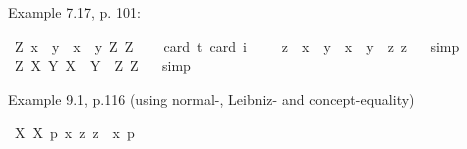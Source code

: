 \begin{isabellebody}
\begin{isamarkuptext}
Example 7.17, p. 101:%
\end{isamarkuptext}\isamarkuptrue%
\isamarkupfalse%
\ {\isachardoublequoteopen}{\isasymlfloor}\isactrlbold {\isasymforall}Z{\isacharcolon}{\isacharcolon}{\isasymup}{\isasymzero}{\isachardot}\ {\isacharparenleft}{\isasymlambda}x{\isacharcolon}{\isacharcolon}{\isasymzero}{\isachardot}\ \ \isactrlbold {\isasymbox}{\isacharparenleft}{\isacharparenleft}{\isasymlambda}y{\isacharcolon}{\isacharcolon}{\isasymzero}{\isachardot}\ \ x\ \isactrlbold {\isasymapprox}\ y{\isacharparenright}\ {\isasymdownharpoonleft}Z{\isacharparenright}{\isacharparenright}\ {\isasymdownharpoonleft}Z{\isasymrfloor}{\isachardoublequoteclose}\ \isanewline
\ \ \isamarkupfalse%
{\isacharbrackleft}card\ {\isacharprime}t{\isacharequal}{}{\isacharcomma}\ card\ i{\isacharequal}{}{\isacharbrackright}%
\ %
%
\isamarkupfalse%
\ %
%
%
%
\isanewline
{}\isamarkupfalse%
\ {\isachardoublequoteopen}{\isasymlfloor}\isactrlbold {\isasymforall}z{\isacharcolon}{\isacharcolon}{\isasymzero}{\isachardot}\ \ {\isacharparenleft}{\isasymlambda}x{\isacharcolon}{\isacharcolon}{\isasymzero}{\isachardot}\ \ \isactrlbold {\isasymbox}{\isacharparenleft}{\isacharparenleft}{\isasymlambda}y{\isacharcolon}{\isacharcolon}{\isasymzero}{\isachardot}\ \ x\ \isactrlbold {\isasymapprox}\ y{\isacharparenright}\ \ z{\isacharparenright}{\isacharparenright}\ z{\isasymrfloor}{\isachardoublequoteclose}%
\ %
%
\isamarkupfalse%
\ simp%
%
%
\isanewline
{}\isamarkupfalse%
\ {\isachardoublequoteopen}{\isasymlfloor}\isactrlbold {\isasymforall}Z{\isacharcolon}{\isacharcolon}{\isasymup}{\isasymzero}{\isachardot}\ {\isacharparenleft}{\isasymlambda}X{\isacharcolon}{\isacharcolon}{\isasymup}{\isasymzero}{\isachardot}\ \isactrlbold {\isasymbox}{\isacharparenleft}{\isacharparenleft}{\isasymlambda}Y{\isacharcolon}{\isacharcolon}{\isasymup}{\isasymzero}{\isachardot}\ X\ \isactrlbold {\isasymapprox}\ Y{\isacharparenright}\ \ Z{\isacharparenright}{\isacharparenright}\ Z{\isasymrfloor}{\isachardoublequoteclose}%
\ %
%
\isamarkupfalse%
\ simp%
%
%
%
\begin{isamarkuptext}%
Example 9.1, p.116 (using normal-, Leibniz- and concept-equality)%
\end{isamarkuptext}\isamarkuptrue%
\isamarkupfalse%
\ {\isachardoublequoteopen}{\isasymlfloor}{\isacharparenleft}{\isacharparenleft}{\isasymlambda}X{\isachardot}\ \isactrlbold {\isasymbox}{\isacharparenleft}X\ {\isasymdownharpoonleft}{\isacharparenleft}p{\isacharcolon}{\isacharcolon}{\isasymup}{\isasymzero}{\isacharparenright}{\isacharparenright}{\isacharparenright}\ \isactrlbold {\isasymdown}{\isacharparenleft}{\isasymlambda}x{\isachardot}\ \isactrlbold {\isasymdiamond}{\isacharparenleft}{\isasymlambda}z{\isachardot}\ z\ \isactrlbold {\isasymapprox}\ x{\isacharparenright}\ {\isasymdownharpoonleft}p{\isacharparenright}{\isacharparenright}{\isasymrfloor}{\isachardoublequoteclose}%

\end{isabellebody}
